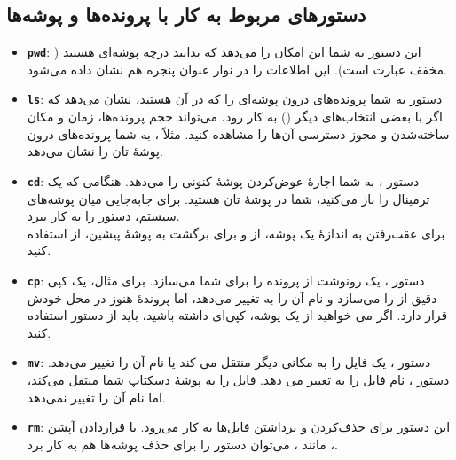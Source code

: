 \subsection{دستورهای مربوط به کار با پرونده‌ها و پوشه‌ها}
\begin{itemize}
\item \textbf{\texttt{\Large pwd}}: این دستور به شما این امکان را می‌دهد که بدانید درچه پوشه‌ای هستید ( مخفف عبارت  است).  این اطلاعات را در نوار عنوان پنجره هم نشان داده می‌شود.

\item \textbf{\texttt{\Large ls}}: دستور  به شما پرونده‌های درون پوشه‌ای را که در آن هستید، نشان می‌دهد که اگر با بعضی انتخاب‌های دیگر () به کار رود، می‌تواند حجم پرونده‌ها، زمان و مکان ساخته‌شدن و مجوز دسترسی آن‌ها را مشاهده کنید. مثلاً ، به شما پرونده‌های درون پوشهٔ تان را نشان می‌دهد.

\item \textbf{\texttt{\Large cd}}: دستور ، به شما اجازهٔ عوض‌کردن پوشهٔ کنونی را می‌دهد. هنگامی که یک ترمینال را باز می‌کنید، شما در پوشهٔ تان هستید. برای جابه‌جایی میان پوشه‌های سیستم، دستور  را به کار ببرد.\\
برای عقب‌رفتن به اندازهٔ یک پوشه، از  و برای برگشت به پوشهٔ پیشین، از  استفاده کنید.

\item \textbf{\texttt{\Large cp}}: دستور ، یک رونوشت از پرونده را برای شما می‌سازد. برای مثال،  یک کپی دقیق از  را می‌سازد و نام آن را به  تغییر می‌دهد، اما پروندهٔ  هنوز در محل خودش قرار دارد. اگر می خواهید از یک پوشه، کپی‌ای داشته باشید، باید از دستور  استفاده کنید.

\item \textbf{\texttt{\Large mv}}: دستور ، یک فایل را به مکانی دیگر منتقل می کند یا نام آن را تغییر می‌دهد. دستور ، نام فایل  را به  تغییر می دهد.  فایل  را به پوشهٔ دسکتاپ شما منتقل می‌کند، اما نام آن را تغییر نمی‌دهد.

\item \textbf{\texttt{\Large rm}}: این دستور برای حذف‌کردن و برداشتن فایل‌ها به کار می‌رود. با قراردادن آپشن ، مانند ، می‌توان دستور را برای حذف پوشه‌ها هم به کار برد.


\end{itemize}
